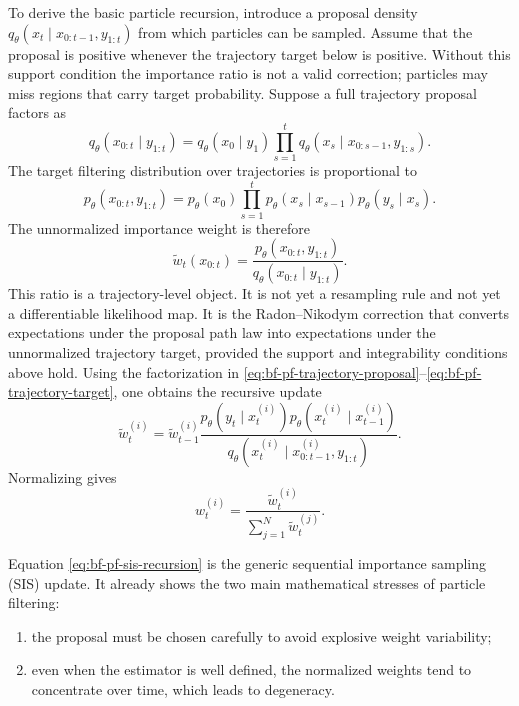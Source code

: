To derive the basic particle recursion, introduce a proposal density
$q_\theta(x_t \mid x_{0:t-1}, y_{1:t})$ from which particles can be sampled.
Assume that the proposal is positive whenever the trajectory target below is
positive.  Without this support condition the importance ratio is not a valid
correction; particles may miss regions that carry target probability.
Suppose a full trajectory proposal factors as
\begin{equation}
\label{eq:bf-pf-trajectory-proposal}
  q_\theta(x_{0:t} \mid y_{1:t})
  = q_\theta(x_0 \mid y_1)
    \prod_{s=1}^t q_\theta(x_s \mid x_{0:s-1}, y_{1:s}).
\end{equation}
The target filtering distribution over trajectories is proportional to
\begin{equation}
\label{eq:bf-pf-trajectory-target}
  p_\theta(x_{0:t}, y_{1:t})
  = p_\theta(x_0)
    \prod_{s=1}^t p_\theta(x_s \mid x_{s-1})
    p_\theta(y_s \mid x_s).
\end{equation}
The unnormalized importance weight is therefore
\begin{equation}
\label{eq:bf-pf-importance-weight}
  \tilde w_t(x_{0:t})
  = \frac{p_\theta(x_{0:t},y_{1:t})}
         {q_\theta(x_{0:t} \mid y_{1:t})}.
\end{equation}
This ratio is a trajectory-level object.  It is not yet a resampling rule and
not yet a differentiable likelihood map.  It is the Radon--Nikodym correction
that converts expectations under the proposal path law into expectations under
the unnormalized trajectory target, provided the support and integrability
conditions above hold.
Using the factorization in
\eqref{eq:bf-pf-trajectory-proposal}--\eqref{eq:bf-pf-trajectory-target}, one
obtains the recursive update
\begin{equation}
\label{eq:bf-pf-sis-recursion}
  \tilde w_t^{(i)}
  = \tilde w_{t-1}^{(i)}
    \frac{p_\theta(y_t \mid x_t^{(i)})
          p_\theta(x_t^{(i)} \mid x_{t-1}^{(i)})}
         {q_\theta(x_t^{(i)} \mid x_{0:t-1}^{(i)}, y_{1:t})}.
\end{equation}
Normalizing gives
\begin{equation}
\label{eq:bf-pf-normalized-weights}
  w_t^{(i)}
  = \frac{\tilde w_t^{(i)}}{\sum_{j=1}^N \tilde w_t^{(j)}}.
\end{equation}

Equation \eqref{eq:bf-pf-sis-recursion} is the generic sequential importance
sampling (SIS) update.  It already shows the two main mathematical stresses of
particle filtering:
\begin{enumerate}[label=(\roman*)]
  \item the proposal must be chosen carefully to avoid explosive weight
    variability;
  \item even when the estimator is well defined, the normalized weights tend to
    concentrate over time, which leads to degeneracy.
\end{enumerate}

